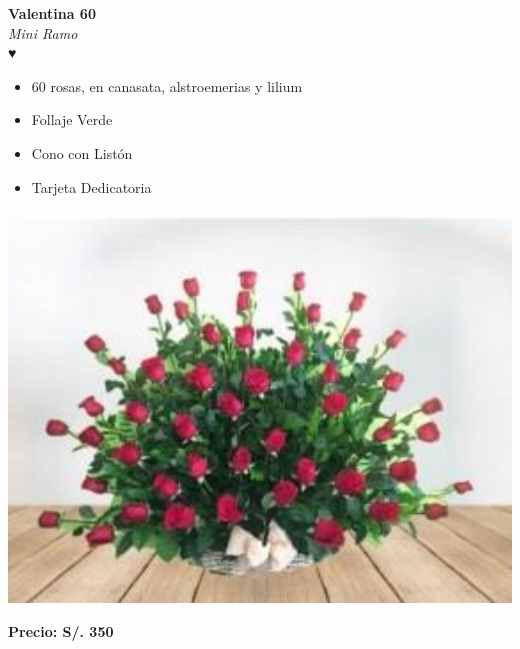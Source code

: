 \documentclass{article}
\begin{document}
\noindent
\begin{minipage}{0.6\textwidth}
    \textcolor{cpred}{\textbf{\huge Valentina 60 }}\\
    {\textit{Mini Ramo}} \\
    \textcolor{cpred}{\Huge ♥} \\
    \vspace{0.5cm}
    \begin{itemize}
        \item 60 rosas, en canasata, alstroemerias y lilium
        \item Follaje Verde
        \item Cono con Listón
        \item Tarjeta Dedicatoria
    \end{itemize}
\end{minipage}
\hspace{1cm}
\begin{minipage}{0.35\textwidth}
    \includegraphics[width=1.0\textwidth]{imagenes_extraidas/image_11_4}
\end{minipage}
\vspace{0.3cm}
\begin{center}
   \textbf{\Large Precio: \textcolor{cpred}{S/. 350 }}
\end{center}
\vspace{1cm}
\end{document}
